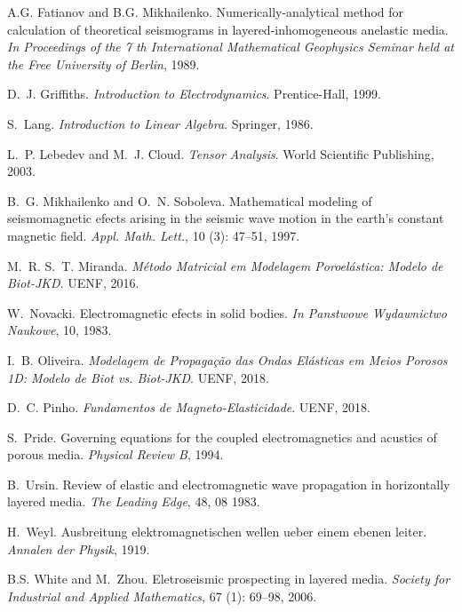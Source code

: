 \documentclass[12pt,a4paper,openany]{abntex2}
\begin{document}
\begin{thebibliography}{25}
A.G. Fatianov and B.G. Mikhailenko.
\newblock Numerically-analytical method for calculation of theoretical
  seismograms in layered-inhomogeneous anelastic media.
\newblock \emph{In Proceedings of the 7 th International Mathematical
  Geophysics Seminar held at the Free University of Berlin}, 1989.

D.~J. Griffiths.
\newblock \emph{Introduction to Electrodynamics}.
\newblock Prentice-Hall, 1999.

S.~Lang.
\newblock \emph{Introduction to Linear Algebra}.
\newblock Springer, 1986.

L.~P. Lebedev and M.~J. Cloud.
\newblock \emph{Tensor Analysis}.
\newblock World Scientific Publishing, 2003.

B.~G. Mikhailenko and O.~N. Soboleva.
\newblock Mathematical modeling of seismomagnetic efects arising in the seismic
  wave motion in the earth's constant magnetic field.
\newblock \emph{Appl. Math. Lett.}, 10 (3): 47--51, 1997.

M.~R. S.~T. Miranda.
\newblock \emph{M\'etodo Matricial em Modelagem Poroel\'astica: Modelo de
  Biot-JKD}.
\newblock UENF, 2016.

W.~Novacki.
\newblock Electromagnetic efects in solid bodies.
\newblock \emph{In Panstwowe Wydawnictwo Naukowe}, 10, 1983.

I.~B. Oliveira.
\newblock \emph{Modelagem de Propaga\c{c}\~ao das Ondas El\'asticas em Meios
  Porosos 1D: Modelo de Biot vs. Biot-JKD}.
\newblock UENF, 2018.

D.~C. Pinho.
\newblock \emph{Fundamentos de Magneto-Elasticidade}.
\newblock UENF, 2018.

S.~Pride.
\newblock Governing equations for the coupled electromagnetics and acustics of
  porous media.
\newblock \emph{Physical Review B}, 1994.

B.~Ursin.
\newblock Review of elastic and electromagnetic wave propagation in
  horizontally layered media.
\newblock \emph{The Leading Edge}, 48, 08 1983.

H.~Weyl.
\newblock Ausbreitung elektromagnetischen wellen ueber einem ebenen leiter.
\newblock \emph{Annalen der Physik}, 1919.

B.S. White and M.~Zhou.
\newblock Eletroseismic prospecting in layered media.
\newblock \emph{Society for Industrial and Applied Mathematics}, 67
  (1): 69--98, 2006.

\end{thebibliography}
\end{document}

